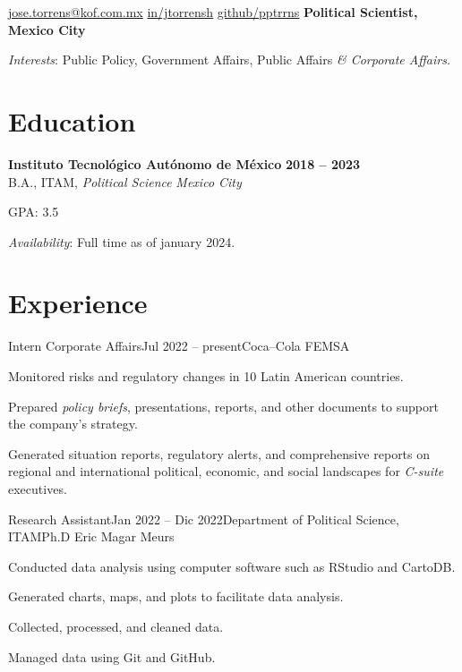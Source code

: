 \documentclass[letter]{resume}
\begin{document}
\begin{center}
{\href{mailto://jose.torrens@kof.com.mx}{jose.torrens@kof.com.mx}}
{\href{https://www.linkedin.com/in/jtorrensh/}{in/jtorrensh}}
{\href{https://github.com/pptrrns}{github/pptrrns}}
{\bf Political Scientist, Mexico City}

\emph{Interests}: {Public Policy, Government Affairs, Public Affairs \em\& Corporate Affairs.}
\end{center}

\section{Education} 
\begin{content}
{\bf Instituto Tecnológico Autónomo de México} \emph {} \hfill {\bf 2018 -- 2023} \\ 
{B.A., ITAM, \emph{Political Science}} \hfill \emph {Mexico City}

GPA: 3.5

\emph{Availability}: {Full time as of january 2024.}

\sectionlineskip
\end{content}

\section{Experience}
\begin{content}

\begin{position}{Intern Corporate Affairs}{Jul 2022 -- present}{Coca–Cola FEMSA}{}{}
  \item Monitored risks and regulatory changes in 10 Latin American countries.
  \item Prepared \emph{policy briefs}, presentations, reports, and other documents to support the company's strategy.
  \item Generated situation reports, regulatory alerts, and comprehensive reports on regional and international political, economic, and social landscapes for \emph{C-suite} executives.
\end{position}
\vspace{-.0001 \baselineskip}

\begin{position}{Research Assistant}{Jan 2022 -- Dic 2022}{Department of Political Science, ITAM}{Ph.D Eric Magar Meurs}{}
  \item Conducted data analysis using computer software such as RStudio and CartoDB.
  \item Generated charts, maps, and plots to facilitate data analysis.
  \item Collected, processed, and cleaned data.
  \item Managed data using Git and GitHub.
\end{position}
\vspace{-.0001 \baselineskip}

\sectionlineskip
\end{content}
\end{document}
